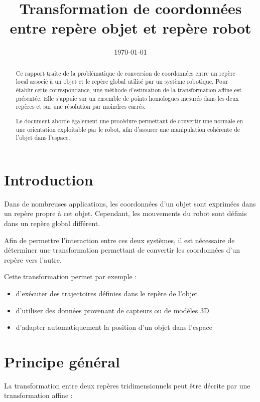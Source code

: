 \documentclass[a4paper,11pt]{article}
\title{\textbf{Transformation de coordonnées entre repère objet et repère robot}}
\author{\phantom{Mariéthoz Cédric}}
\date{\today}
\begin{document}
\maketitle

\begin{abstract}

Ce rapport traite de la problématique de conversion de coordonnées entre un repère local associé à un objet et le repère global utilisé par un système robotique.
Pour établir cette correspondance, une méthode d’estimation de la transformation affine est présentée. Elle s’appuie sur un ensemble de points homologues mesurés dans les deux repères et sur une résolution par moindres carrés.

Le document aborde également une procédure permettant de convertir une normale en une orientation exploitable par le robot, afin d’assurer une manipulation cohérente de l’objet dans l’espace.

\end{abstract}

\tableofcontents
\newpage

\section{Introduction}

Dans de nombreuses applications, les coordonnées d’un objet sont exprimées dans un repère propre à cet objet.  
Cependant, les mouvements du robot sont définis dans un repère global différent.

Afin de permettre l'interaction entre ces deux systèmes, il est nécessaire de déterminer une transformation permettant de convertir les coordonnées d’un repère vers l’autre.

Cette transformation permet par exemple :

\begin{itemize}
\item d’exécuter des trajectoires définies dans le repère de l’objet
\item d’utiliser des données provenant de capteurs ou de modèles 3D
\item d’adapter automatiquement la position d’un objet dans l’espace
\end{itemize}

\section{Principe général}

La transformation entre deux repères tridimensionnels peut être décrite par une transformation affine :
\end{document}
